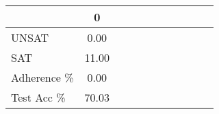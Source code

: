 \begin{tabular}{l|cccccccccc}
\toprule
 & 0 \\
\midrule
UNSAT & 0.00 \\
SAT & 11.00 \\
Adherence \% & 0.00 \\
Test Acc \% & 70.03 \\
\bottomrule
\end{tabular}
